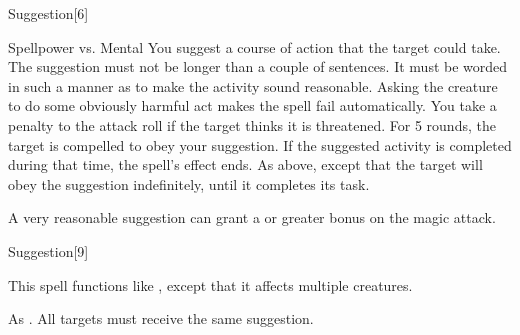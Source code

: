 \begin{spellsection}{Suggestion}[6]
    \begin{spellheader}
    \end{spellheader}
    \begin{spellcontent}
        \begin{spelltargetinginfo}
        \end{spelltargetinginfo}
        \begin{spelleffects}
            \begin{spellattack}{Spellpower vs. Mental}
                \spellspecial You suggest a course of action that the target could take. The suggestion must not be longer than a couple of sentences. It must be worded in such a manner as to make the activity sound reasonable. Asking the creature to do some obviously harmful act makes the spell fail automatically. You take a  penalty to the attack roll if the target thinks it is threatened.
                \spellsuccess For 5 rounds, the target is compelled to obey your suggestion. If the suggested activity is completed during that time, the spell's effect ends.
                \spellcritical As above, except that the target will obey the suggestion indefinitely, until it completes its task.
            \end{spellattack}
        \end{spelleffects}
    \end{spellcontent}
    \begin{spellfooter}
        \spellnotes A very reasonable suggestion can grant a  or greater bonus on the magic attack.

        \norepeatspellnotes
        \miscastrandom
    \end{spellfooter}
\end{spellsection}

\begin{spellsection}[Mass]{Suggestion}[9]
    \begin{spellheader}
    \end{spellheader}
    \begin{spellcontent}
        \begin{spelltargetinginfo}
        \end{spelltargetinginfo}
        \begin{spelleffects}
            \spellspecial This spell functions like , except that it affects multiple creatures.
        \end{spelleffects}
    \end{spellcontent}
    \begin{spellfooter}
        \spellnotes As . All targets must receive the same suggestion.
        \miscastexplode
    \end{spellfooter}
\end{spellsection}

